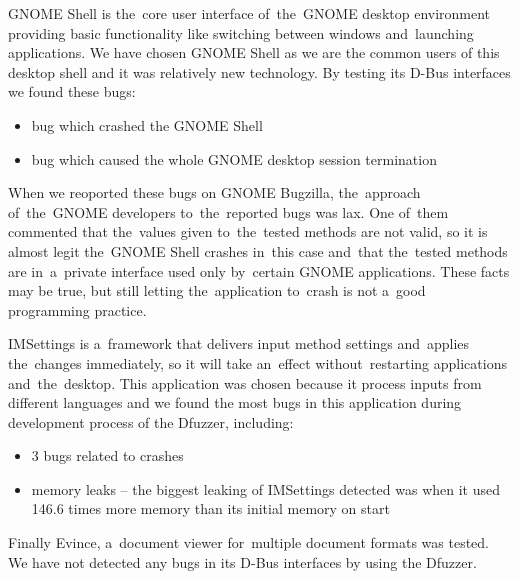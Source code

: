 \documentclass[conference]{IEEEtran}
\begin{document}
GNOME Shell is the~core user interface of~the~GNOME desktop environment
providing basic functionality like switching between windows and~launching
applications. We have chosen GNOME Shell as we are the common users of this
desktop shell and it was relatively new technology. By testing its D-Bus
interfaces we found these bugs:
\begin{itemize}
	\item bug which crashed the GNOME Shell
	\item bug which caused the whole GNOME desktop session termination
\end{itemize}
When we reoported these bugs on GNOME Bugzilla, the~approach of~the~GNOME
developers to~the~reported bugs was lax. One of~them commented that the~values
given to~the~tested methods are not valid, so it is almost legit
the~GNOME Shell crashes in~this case and~that the~tested methods are
in~a~private interface used only by~certain GNOME applications. These facts may
be true, but still letting the~application to~crash is not a~good programming
practice.

IMSettings is a~framework that delivers input method settings and~applies the~changes
immediately, so it will take an~effect without~restarting applications
and~the~desktop. This application was chosen because it process inputs
from different languages and we found the most bugs in this application during
development process of the Dfuzzer, including:
\begin{itemize}
	\item 3 bugs related to crashes
	\item memory leaks -- the biggest leaking of IMSettings detected was when it
		used 146.6 times more memory than its initial memory on start
\end{itemize}

Finally Evince, a~document viewer for~multiple document formats was tested.
We have not detected any bugs in its D-Bus interfaces by using the Dfuzzer.
\end{document}
